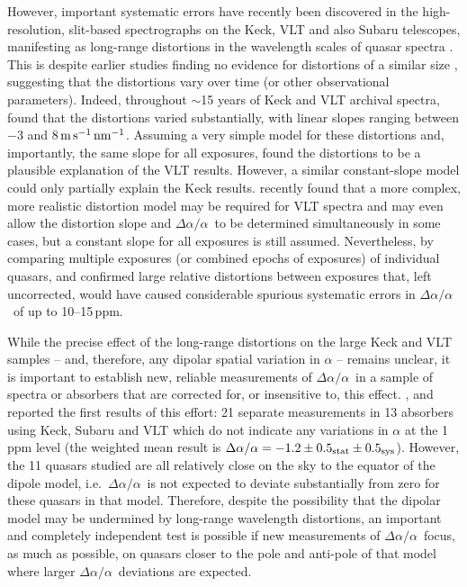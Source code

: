 \documentclass[fleqn,usenatbib,usedcolumn]{mnras}
\newcommand{\ms}{\ensuremath{\textrm{m\,s}^{-1}}}
\newcommand{\daa}{\ensuremath{\Delta\alpha/\alpha}}
\newcommand{\msnm}{\ensuremath{\ms\,\textrm{nm}^{-1}}}
\begin{document}
However, important systematic errors have recently been discovered in the high-resolution, slit-based spectrographs on the Keck, VLT and also Subaru telescopes, manifesting as long-range distortions in the wavelength scales of quasar spectra \citep[e.g.][]{Rahmani:2013:861,Bagdonaite:2014:10,Evans:2014:128,Songaila:2014:103,Whitmore:2015:446,Kotus:2017:3679}. This is despite earlier studies finding no evidence for distortions of a similar size \citep{Molaro:2008:559,Griest:2010:158,Whitmore:2010:89}, suggesting that the distortions vary over time (or other observational parameters). Indeed, throughout $\sim$15 years of Keck and VLT archival spectra, \citet{Whitmore:2015:446} found that the distortions varied substantially, with linear slopes ranging between $-3$ and $8$\,\msnm. Assuming a very simple model for these distortions and, importantly, the same slope for all exposures, \citet{Whitmore:2015:446} found the distortions to be a plausible explanation of the \citet{King:2012:3370} VLT results. However, a similar constant-slope model could only partially explain the \citet{Murphy:2003:609,Murphy:2004:131} Keck results. \citet{Dumont:2017:1568} recently found that a more complex, more realistic distortion model may be required for VLT spectra and may even allow the distortion slope and \daa\ to be determined simultaneously in some cases, but a constant slope for all exposures is still assumed. Nevertheless, by comparing multiple exposures (or combined epochs of exposures) of individual quasars, \citet{Evans:2014:128} and \citet{Kotus:2017:3679} confirmed large relative distortions between exposures that, left uncorrected, would have caused considerable spurious systematic errors in \daa\ of up to 10--15\,ppm.

While the precise effect of the long-range distortions on the large Keck and VLT samples -- and, therefore, any dipolar spatial variation in $\alpha$ -- remains unclear, it is important to establish new, reliable measurements of \daa\ in a sample of spectra or absorbers that are corrected for, or insensitive to, this effect. \citet{Evans:2014:128}, \citet{Murphy:2016:2461} and \citet{Kotus:2017:3679} reported the first results of this effort: 21 separate measurements in 13 absorbers using Keck, Subaru and VLT which do not indicate any variations in $\alpha$ at the 1\,ppm level (the weighted mean result is $\daa = -1.2\pm0.5_{\rm stat}\pm0.5_{\rm sys}$). However, the 11 quasars studied are all relatively close on the sky to the equator of the \citet{King:2012:3370} dipole model, i.e.\ \daa\ is not expected to deviate substantially from zero for these quasars in that model. Therefore, despite the possibility that the dipolar model may be undermined by long-range wavelength distortions, an important and completely independent test is possible if new measurements of \daa\ focus, as much as possible, on quasars closer to the pole and anti-pole of that model where larger \daa\ deviations are expected.
\end{document}
